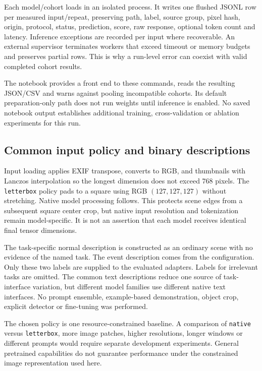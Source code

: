 \documentclass[11pt,a4paper]{article}
\newcommand{\code}[1]{\nolinkurl{#1}}
\begin{document}
Each model/cohort loads in an isolated process. It writes one flushed JSONL row per measured input/repeat, preserving path, label, source group, pixel hash, origin, protocol, status, prediction, score, raw response, optional token count and latency. Inference exceptions are recorded per input where recoverable. An external supervisor terminates workers that exceed timeout or memory budgets and preserves partial rows. This is why a run-level error can coexist with valid completed cohort results.

The notebook provides a front end to these commands, reads the resulting JSON/CSV and warns against pooling incompatible cohorts. Its default preparation-only path does not run weights until inference is enabled. No saved notebook output establishes additional training, cross-validation or ablation experiments for this run.

\subsection{Common input policy and binary descriptions}
Input loading applies EXIF transpose, converts to RGB, and thumbnails with Lanczos interpolation so the longest dimension does not exceed 768 pixels. The \code{letterbox} policy pads to a square using RGB $(127,127,127)$ without stretching. Native model processing follows. This protects scene edges from a subsequent square center crop, but native input resolution and tokenization remain model-specific. It is not an assertion that each model receives identical final tensor dimensions.

The task-specific normal description is constructed as an ordinary scene with no evidence of the named task. The event description comes from the configuration. Only these two labels are supplied to the evaluated adapters. Labels for irrelevant tasks are omitted. The common text descriptions reduce one source of task-interface variation, but different model families use different native text interfaces. No prompt ensemble, example-based demonstration, object crop, explicit detector or fine-tuning was performed.

The chosen policy is one resource-constrained baseline. A comparison of \code{native} versus \code{letterbox}, more image patches, higher resolutions, longer windows or different prompts would require separate development experiments. General pretrained capabilities do not guarantee performance under the constrained image representation used here.
\end{document}
